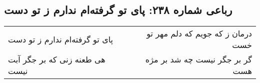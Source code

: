 \begin{center}
\section*{رباعی شماره ۲۳۸: پای تو گرفته‌ام ندارم ز تو دست}
\label{sec:0238}
\begin{longtable}{l p{0.5cm} r}
پای تو گرفته‌ام ندارم ز تو دست
&&
درمان ز که جویم که دلم مهر تو خست
\\
هی طعنه زنی که بر جگر آبت نیست
&&
گر بر جگر نیست چه شد بر مژه هست
\\
\end{longtable}
\end{center}
